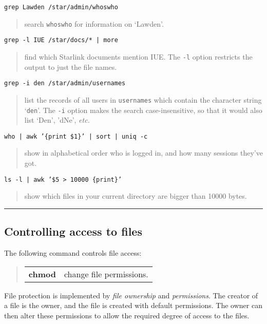 \documentclass[twoside,11pt,nolof]{starlink}
\providecommand{\example}[2]{\goodbreak
                         \texttt{#1}
                         \vspace*{-4mm}
                         \begin{quote}
                           {\small #2}
                         \end{quote}
                        }
\providecommand{\exend}{\begin{center}
                    \rule{50mm}{0.3mm}
                    \end{center}
                   }
\begin{document}
\example{grep Lawden /star/admin/whoswho}
{search \texttt{whoswho} for information on `Lawden'.}

\example{grep -l IUE /star/docs/* | more }
{find which Starlink documents mention IUE.
The \texttt{-l} option restricts the output to just the file names.}

\example{grep -i den /star/admin/usernames}
{list the records of all users in \texttt{usernames} which contain the character
string `\texttt{den}'.
The \texttt{-i} option makes the search case-insensitive, so that it would also
list `Den', 'dNe', \emph{etc.}}

\example{who | awk \texttt{'\{print \$1}\}' | sort | uniq -c}
{show in alphabetical order who is logged in, and how many sessions they've
got.}

\example{ls -l | awk '\$5 > 10000 \{print\}'}
{show which files in your current directory are bigger than 10000 bytes.}

\exend

\subsection{Controlling access to files}

The following command controls file access:

\begin{quote}
\begin{tabular}{lp{72mm}}

\textbf{chmod}  & change file permissions.

\end{tabular}
\end{quote}


File protection is implemented by \emph{file ownership}\/ and \emph{permissions}.
The creator of a file is the owner, and the file is created with default
permissions.
The owner can then alter these permissions to allow the required degree of
access to the files.
\end{document}
